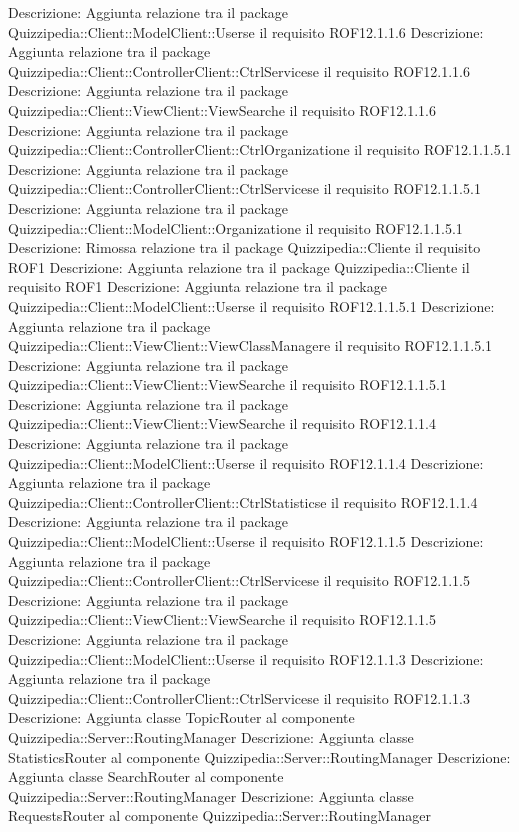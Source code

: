 Descrizione: Aggiunta relazione tra il package Quizzipedia::Client::ModelClient::Userse il requisito ROF12.1.1.6 
Descrizione: Aggiunta relazione tra il package Quizzipedia::Client::ControllerClient::CtrlServicese il requisito ROF12.1.1.6 
Descrizione: Aggiunta relazione tra il package Quizzipedia::Client::ViewClient::ViewSearche il requisito ROF12.1.1.6 
Descrizione: Aggiunta relazione tra il package Quizzipedia::Client::ControllerClient::CtrlOrganizatione il requisito ROF12.1.1.5.1 
Descrizione: Aggiunta relazione tra il package Quizzipedia::Client::ControllerClient::CtrlServicese il requisito ROF12.1.1.5.1 
Descrizione: Aggiunta relazione tra il package Quizzipedia::Client::ModelClient::Organizatione il requisito ROF12.1.1.5.1 
Descrizione: Rimossa relazione tra il package Quizzipedia::Cliente il requisito ROF1 
Descrizione: Aggiunta relazione tra il package Quizzipedia::Cliente il requisito ROF1 
Descrizione: Aggiunta relazione tra il package Quizzipedia::Client::ModelClient::Userse il requisito ROF12.1.1.5.1 
Descrizione: Aggiunta relazione tra il package Quizzipedia::Client::ViewClient::ViewClassManagere il requisito ROF12.1.1.5.1 
Descrizione: Aggiunta relazione tra il package Quizzipedia::Client::ViewClient::ViewSearche il requisito ROF12.1.1.5.1 
Descrizione: Aggiunta relazione tra il package Quizzipedia::Client::ViewClient::ViewSearche il requisito ROF12.1.1.4 
Descrizione: Aggiunta relazione tra il package Quizzipedia::Client::ModelClient::Userse il requisito ROF12.1.1.4 
Descrizione: Aggiunta relazione tra il package Quizzipedia::Client::ControllerClient::CtrlStatisticse il requisito ROF12.1.1.4 
Descrizione: Aggiunta relazione tra il package Quizzipedia::Client::ModelClient::Userse il requisito ROF12.1.1.5 
Descrizione: Aggiunta relazione tra il package Quizzipedia::Client::ControllerClient::CtrlServicese il requisito ROF12.1.1.5 
Descrizione: Aggiunta relazione tra il package Quizzipedia::Client::ViewClient::ViewSearche il requisito ROF12.1.1.5 
Descrizione: Aggiunta relazione tra il package Quizzipedia::Client::ModelClient::Userse il requisito ROF12.1.1.3 
Descrizione: Aggiunta relazione tra il package Quizzipedia::Client::ControllerClient::CtrlServicese il requisito ROF12.1.1.3 
Descrizione: Aggiunta classe TopicRouter al componente Quizzipedia::Server::RoutingManager 
Descrizione: Aggiunta classe StatisticsRouter al componente Quizzipedia::Server::RoutingManager 
Descrizione: Aggiunta classe SearchRouter al componente Quizzipedia::Server::RoutingManager 
Descrizione: Aggiunta classe RequestsRouter al componente Quizzipedia::Server::RoutingManager 
